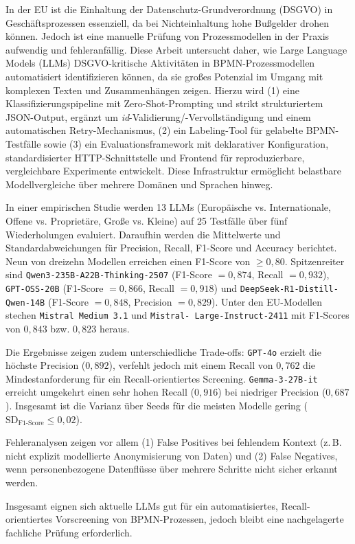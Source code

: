 \documentclass[a4paper,12pt,
headsepline,           %
oneside,               %
pointlessnumbers,      %
bibtotoc,              %
BCOR15mm               %
]{scrbook}
\newenvironment{abstract}{}{}
\begin{document}
\begin{abstract}
    In der EU ist die Einhaltung der Datenschutz-Grundverordnung (DSGVO) in Geschäftsprozessen essenziell, da bei Nichteinhaltung hohe Bußgelder drohen können. Jedoch ist eine manuelle Prüfung von Prozessmodellen in der Praxis aufwendig und fehleranfällig. Diese Arbeit untersucht daher, wie Large Language Models (LLMs) DSGVO-kritische Aktivitäten in BPMN-Prozessmodellen automatisiert identifizieren können, da sie großes Potenzial im Umgang mit komplexen Texten und Zusammenhängen zeigen. Hierzu wird (1) eine Klassifizierungspipeline mit Zero-Shot-Prompting und strikt strukturiertem JSON-Output, ergänzt um \emph{id}-Validierung/-Vervollständigung und einem automatischen Retry-Mechanismus, (2) ein Labeling-Tool für gelabelte BPMN-Testfälle sowie (3) ein Evaluationsframework mit deklarativer Konfiguration, standardisierter HTTP-Schnittstelle und Frontend für reproduzierbare, vergleichbare Experimente entwickelt. Diese Infrastruktur ermöglicht belastbare Modellvergleiche über mehrere Domänen und Sprachen hinweg.

    In einer empirischen Studie werden 13 LLMs (Europäische vs. Internationale, Offene vs. Proprietäre, Große vs. Kleine) auf 25 Testfälle über fünf Wiederholungen evaluiert. Daraufhin werden die Mittelwerte und Standardabweichungen für Precision, Recall, F1-Score und Accuracy berichtet. Neun von dreizehn Modellen erreichen einen F1-Score von $\ge 0{,}80$. Spitzenreiter sind \texttt{Qwen3-235B-A22B-Thinking-2507} (F1-Score $=0{,}874$, Recall $=0{,}932$), \texttt{GPT-OSS-20B} (F1-Score $=0{,}866$, Recall $=0{,}918$) und \texttt{DeepSeek-R1-Distill-Qwen-14B} (F1-Score $=0{,}848$, Precision $=0{,}829$). Unter den EU-Modellen stechen \texttt{Mistral Medium 3.1} und \texttt{Mistral-\linebreak~Large-Instruct-2411} mit F1-Scores von $0{,}843$ bzw. $0{,}823$ heraus.

    Die Ergebnisse zeigen zudem unterschiedliche Trade-offs: \texttt{GPT-4o} erzielt die höchste Precision ($0{,}892$), verfehlt jedoch mit einem Recall von $0{,}762$ die Mindestanforderung für ein Recall-orientiertes Screening. \texttt{Gemma-3-27B-it} erreicht umgekehrt einen sehr hohen Recall ($0{,}916$) bei niedriger Precision ($0{,}687$). Insgesamt ist die Varianz über Seeds für die meisten Modelle gering ($\text{SD}_{\text{F1-Score}}\le 0{,}02$).

    Fehleranalysen zeigen vor allem (1) False Positives bei fehlendem Kontext (z.\,B. nicht explizit modellierte Anonymisierung von Daten) und (2) False Negatives, wenn personenbezogene Datenflüsse über mehrere Schritte nicht sicher erkannt werden.

    Insgesamt eignen sich aktuelle LLMs gut für ein automatisiertes, Recall-orientiertes Vorscreening von BPMN-Prozessen, jedoch bleibt eine nachgelagerte fachliche Prüfung erforderlich.
\end{abstract}
\end{document}
